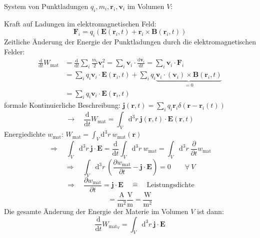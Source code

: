 \documentclass[titlepage,11pt,a4paper,ngerman]{report}
\newcommand{\tx}[1]{\textrm{#1}}
\newcommand{\ub}[1]{\underbrace{#1}}
\newcommand{\dd}{\tx{d}}
\newcommand{\prt}[2]{\frac{\partial #1}{\partial #2}}
\newcommand{\prd}[2]{\frac{\tx{d} #1}{\tx{d} #2}}
\renewcommand{\vec}[1]{\boldsymbol{#1}}
\begin{document}
System von Punktladungen $ q_i, m_i, \vec{r}_i, \vec{v}_i $ im Volumen $ V $:


\noindent
Kraft auf Ladungen im elektromagnetischen Feld:
\begin{equation*}
\vec{F}_i = q_i \left(\vec{E}(\vec{r}_i, t) + \vec{r}_i \times \vec{B}(\vec{r}_i, t) \right)
\end{equation*}
Zeitliche Änderung der Energie der Punktladungen durch die elektromagnetischen Felder:
\begin{align*}
\prd{}{t} W_{\tx{mat}} &= \prd{}{t} \sum_i \frac{m_i}{2} \vec{v}_i^2 = \sum_i \vec{v}_i \cdot \prd{\vec{v}_i}{t} = \sum_i \vec{v}_i \cdot \vec{F}_i\\
&= \sum_i q_i \vec{v}_i \cdot \vec{E}(\vec{r}_i, t) + \sum_i q_i \ub{ \vec{v}_i \cdot (\vec{v}_i) \times \vec{B}(\vec{r}_i, t) }_{=0}\\
&= \sum_i q_i \vec{v}_i \cdot \vec{E}(\vec{r}_i, t)
\end{align*}
formale Kontinuierliche Beschreibung: $ \vec{j}(\vec{r},t) = \sum_i q_i \vec{r}_i \delta(\vec{r} - \vec{r}_i(t)) $
\begin{equation*}
\rightarrow \quad \prd{}{t} W_{\tx{mat}} = \int_V \dd^3 r \ \vec{j}(\vec{r},t) \cdot \vec{E}(\vec{r},t)
\end{equation*}
Energiedichte $ w_{\tx{mat}} $: $ W_{\tx{mat}} = \int_V \dd^3 r \ w_{\tx{mat}} (\vec{r}) $
\begin{equation*}
\Rightarrow \quad \int_V \dd^3 r \ \vec{j} \cdot \vec{E} = \prd{}{t} \int_V \dd^3 r \ w_{\tx{mat}} = \int_V \dd^3 r \ \prt{}{t} w_{\tx{mat}}
\end{equation*}
\begin{equation*}
\Rightarrow \quad \int_V \dd^3 r \ \left(\prt{w_{\tx{mat}}}{t} - \vec{j} \cdot \vec{E} \right) = 0 \qquad \forall \ V
\end{equation*}
\begin{equation*}
\Rightarrow \quad \prt{w_{\tx{mat}}}{t} = \vec{j} \cdot \vec{E} \quad \widehat{=} \quad \tx{Leistungsdichte}
\end{equation*}
\begin{equation*}
[\vec{j}] [\vec{E}] = \frac{\tx{A}}{\tx{m}^2} \frac{\tx{V}}{\tx{m}} = \frac{\tx{W}}{\tx{m}^2}
\end{equation*}
Die gesamte Änderung der Energie der Materie im Volumen $ V $ ist dann:
\begin{equation*}
\prd{}{t} W_{\tx{mat}_V} = \int_V \dd^3 r \ \vec{j} \cdot \vec{E}
\end{equation*}
\end{document}
